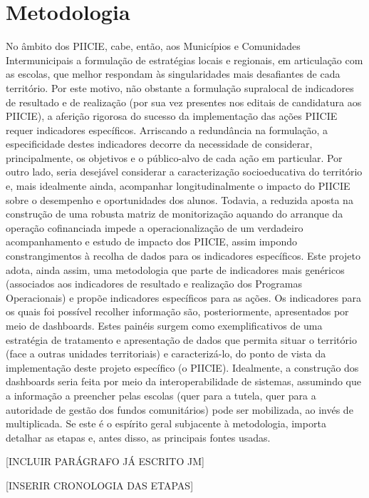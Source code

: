 \documentclass[
]{book}
\theoremstyle{definition}
\theoremstyle{definition}
\theoremstyle{definition}
\theoremstyle{definition}
\theoremstyle{remark}
\begin{document}
\hypertarget{metodologia}{%
\section{Metodologia}\label{metodologia}}

No âmbito dos PIICIE, cabe, então, aos Municípios e Comunidades Intermunicipais a formulação de estratégias locais e regionais, em articulação com as escolas, que melhor respondam às singularidades mais desafiantes de cada território. Por este motivo, não obstante a formulação supralocal de indicadores de resultado e de realização (por sua vez presentes nos editais de candidatura aos PIICIE), a aferição rigorosa do sucesso da implementação das ações PIICIE requer indicadores específicos. Arriscando a redundância na formulação, a especificidade destes indicadores decorre da necessidade de considerar, principalmente, os objetivos e o público-alvo de cada ação em particular. Por outro lado, seria desejável considerar a caracterização socioeducativa do território e, mais idealmente ainda, acompanhar longitudinalmente o impacto do PIICIE sobre o desempenho e oportunidades dos alunos. Todavia, a reduzida aposta na construção de uma robusta matriz de monitorização aquando do arranque da operação cofinanciada impede a operacionalização de um verdadeiro acompanhamento e estudo de impacto dos PIICIE, assim impondo constrangimentos à recolha de dados para os indicadores específicos.
Este projeto adota, ainda assim, uma metodologia que parte de indicadores mais genéricos (associados aos indicadores de resultado e realização dos Programas Operacionais) e propõe indicadores específicos para as ações. Os indicadores para os quais foi possível recolher informação são, posteriormente, apresentados por meio de dashboards. Estes painéis surgem como exemplificativos de uma estratégia de tratamento e apresentação de dados que permita situar o território (face a outras unidades territoriais) e caracterizá-lo, do ponto de vista da implementação deste projeto específico (o PIICIE). Idealmente, a construção dos dashboards seria feita por meio da interoperabilidade de sistemas, assumindo que a informação a preencher pelas escolas (quer para a tutela, quer para a autoridade de gestão dos fundos comunitários) pode ser mobilizada, ao invés de multiplicada.
Se este é o espírito geral subjacente à metodologia, importa detalhar as etapas e, antes disso, as principais fontes usadas.

{[}INCLUIR PARÁGRAFO JÁ ESCRITO JM{]}

{[}INSERIR CRONOLOGIA DAS ETAPAS{]}
\end{document}
